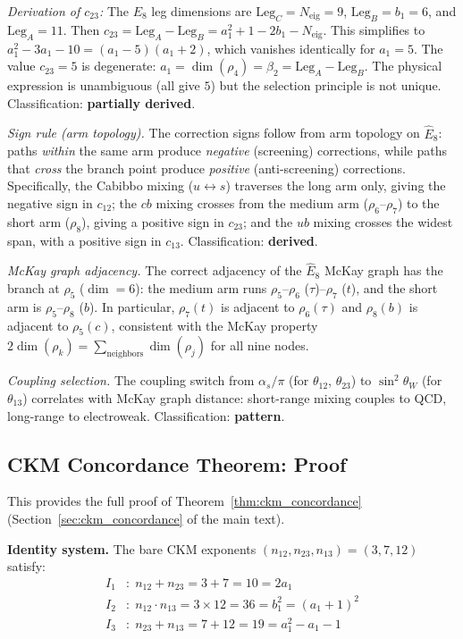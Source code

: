 \documentclass[12pt,a4paper]{article}
\theoremstyle{definition}
\begin{document}
\textit{Derivation of $c_{23}$:} The $E_8$ leg dimensions are $\text{Leg}_C = N_{\text{eig}} = 9$, $\text{Leg}_B = b_1 = 6$, and $\text{Leg}_A = 11$.  Then $c_{23} = \text{Leg}_A - \text{Leg}_B = a_1^2 + 1 - 2b_1 - N_{\text{eig}}$.  This simplifies to $a_1^2 - 3a_1 - 10 = (a_1-5)(a_1+2)$, which vanishes identically for $a_1 = 5$.  The value $c_{23} = 5$ is degenerate: $a_1 = \dim(\rho_4) = \beta_2 = \text{Leg}_A - \text{Leg}_B$.  The physical expression is unambiguous (all give $5$) but the selection principle is not unique.  Classification: \textbf{partially derived}.

\textit{Sign rule (arm topology).}  The correction signs follow from arm topology on $\hat{E}_8$: paths \emph{within} the same arm produce \emph{negative} (screening) corrections, while paths that \emph{cross} the branch point produce \emph{positive} (anti-screening) corrections.  Specifically, the Cabibbo mixing ($u \leftrightarrow s$) traverses the long arm only, giving the negative sign in $c_{12}$; the $cb$ mixing crosses from the medium arm ($\rho_6$--$\rho_7$) to the short arm ($\rho_8$), giving a positive sign in $c_{23}$; and the $ub$ mixing crosses the widest span, with a positive sign in $c_{13}$.  Classification: \textbf{derived}.

\textit{McKay graph adjacency.}  The correct adjacency of the $\hat{E}_8$ McKay graph has the branch at $\rho_5$ ($\dim = 6$): the medium arm runs $\rho_5$--$\rho_6$ ($\tau$)--$\rho_7$ ($t$), and the short arm is $\rho_5$--$\rho_8$ ($b$).  In particular, $\rho_7(t)$ is adjacent to $\rho_6(\tau)$ and $\rho_8(b)$ is adjacent to $\rho_5(c)$, consistent with the McKay property $2\dim(\rho_k) = \sum_{\text{neighbors}} \dim(\rho_j)$ for all nine nodes.

\textit{Coupling selection.}  The coupling switch from $\alpha_s/\pi$ (for $\theta_{12}$, $\theta_{23}$) to $\sin^2\theta_W$ (for $\theta_{13}$) correlates with McKay graph distance: short-range mixing couples to QCD, long-range to electroweak.  Classification: \textbf{pattern}.

\subsection{CKM Concordance Theorem: Proof}
\label{sec:S-ckm-concordance}

This provides the full proof of Theorem~\ref{thm:ckm_concordance} (Section~\ref{sec:ckm_concordance} of the main text).

\textbf{Identity system.}  The bare CKM exponents $(n_{12}, n_{23}, n_{13}) = (3, 7, 12)$ satisfy:
\begin{align}
I_1&\colon\; n_{12} + n_{23} = 3 + 7 = 10 = 2a_1 \\
I_2&\colon\; n_{12} \cdot n_{13} = 3 \times 12 = 36 = b_1^2 = (a_1+1)^2 \\
I_3&\colon\; n_{23} + n_{13} = 7 + 12 = 19 = a_1^2 - a_1 - 1
\end{align}
\end{document}
